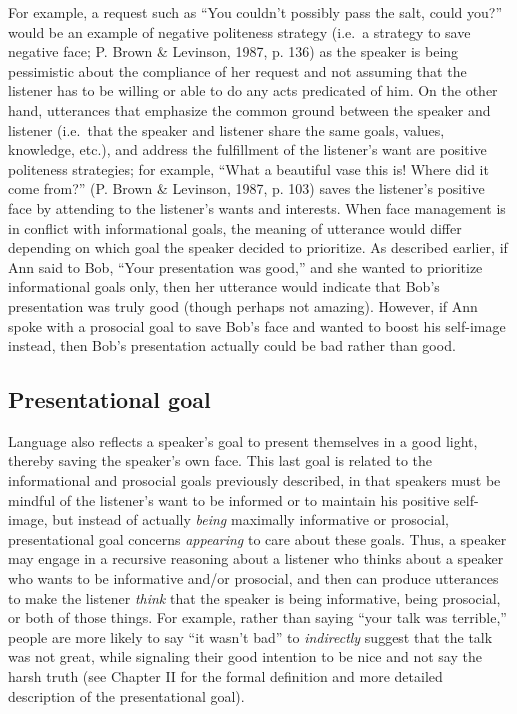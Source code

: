 \documentclass[oneside]{report}
\begin{document}
For example, a request such as ``You couldn't possibly pass the salt,
could you?'' would be an example of negative politeness strategy (i.e.~a
strategy to save negative face; P. Brown \& Levinson, 1987, p. 136) as
the speaker is being pessimistic about the compliance of her request and
not assuming that the listener has to be willing or able to do any acts
predicated of him. On the other hand, utterances that emphasize the
common ground between the speaker and listener (i.e.~that the speaker
and listener share the same goals, values, knowledge, etc.), and address
the fulfillment of the listener's want are positive politeness
strategies; for example, ``What a beautiful vase this is! Where did it
come from?'' (P. Brown \& Levinson, 1987, p. 103) saves the listener's
positive face by attending to the listener's wants and interests. When
face management is in conflict with informational goals, the meaning of
utterance would differ depending on which goal the speaker decided to
prioritize. As described earlier, if Ann said to Bob, ``Your
presentation was good,'' and she wanted to prioritize informational
goals only, then her utterance would indicate that Bob's presentation
was truly good (though perhaps not amazing). However, if Ann spoke with
a prosocial goal to save Bob's face and wanted to boost his self-image
instead, then Bob's presentation actually could be bad rather than good.

\subsection{Presentational goal}\label{presentational-goal}

Language also reflects a speaker's goal to present themselves in a good
light, thereby saving the speaker's own face. This last goal is related
to the informational and prosocial goals previously described, in that
speakers must be mindful of the listener's want to be informed or to
maintain his positive self-image, but instead of actually \emph{being}
maximally informative or prosocial, presentational goal concerns
\emph{appearing} to care about these goals. Thus, a speaker may engage
in a recursive reasoning about a listener who thinks about a speaker who
wants to be informative and/or prosocial, and then can produce
utterances to make the listener \emph{think} that the speaker is being
informative, being prosocial, or both of those things. For example,
rather than saying ``your talk was terrible,'' people are more likely to
say ``it wasn't bad'' to \emph{indirectly} suggest that the talk was not
great, while signaling their good intention to be nice and not say the
harsh truth (see Chapter II for the formal definition and more detailed
description of the presentational goal).
\end{document}
